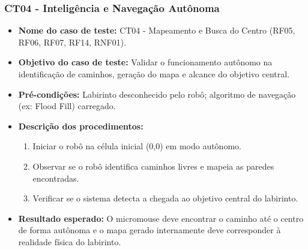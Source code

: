     \subsubsection{CT04 - Inteligência e Navegação Autônoma}
    \begin{itemize}
        \item \textbf{Nome do caso de teste:} CT04 - Mapeamento e Busca do Centro (RF05, RF06, RF07, RF14, RNF01).
        \item \textbf{Objetivo do caso de teste:} Validar o funcionamento autônomo na identificação de caminhos, geração do mapa e alcance do objetivo central.
        \item \textbf{Pré-condições:} Labirinto desconhecido pelo robô; algoritmo de navegação (ex: Flood Fill) carregado.
        \item \textbf{Descrição dos procedimentos:}
        \begin{enumerate}
            \item Iniciar o robô na célula inicial (0,0) em modo autônomo.
            \item Observar se o robô identifica caminhos livres e mapeia as paredes encontradas.
            \item Verificar se o sistema detecta a chegada ao objetivo central do labirinto.
        \end{enumerate}
        \item \textbf{Resultado esperado:} O micromouse deve encontrar o caminho até o centro de forma autônoma e o mapa gerado internamente deve corresponder à realidade física do labirinto.
    \end{itemize}

